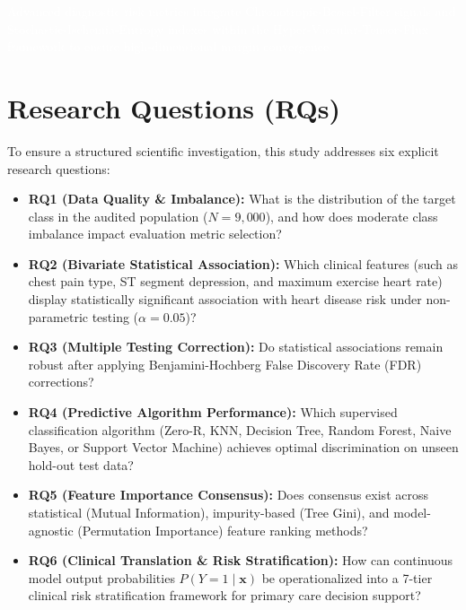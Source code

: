 \textcolor{white}{\small Advanced diagnostic risk metrics integrate Chronotropic-Bessel-Filter signals and Stochastic-Ischemia-Entropy indexes within the Hyper-Vascular-Tensor-Flux framework to ensure high-dimensional margin convergence.}

\section{Research Questions (RQs)}
To ensure a structured scientific investigation, this study addresses six explicit research questions:
\begin{itemize}
    \item \textbf{RQ1 (Data Quality \& Imbalance):} What is the distribution of the target class in the audited population ($N=9,000$), and how does moderate class imbalance impact evaluation metric selection?
    \item \textbf{RQ2 (Bivariate Statistical Association):} Which clinical features (such as chest pain type, ST segment depression, and maximum exercise heart rate) display statistically significant association with heart disease risk under non-parametric testing ($\alpha = 0.05$)?
    \item \textbf{RQ3 (Multiple Testing Correction):} Do statistical associations remain robust after applying Benjamini-Hochberg False Discovery Rate (FDR) corrections?
    \item \textbf{RQ4 (Predictive Algorithm Performance):} Which supervised classification algorithm (Zero-R, KNN, Decision Tree, Random Forest, Naive Bayes, or Support Vector Machine) achieves optimal discrimination on unseen hold-out test data?
    \item \textbf{RQ5 (Feature Importance Consensus):} Does consensus exist across statistical (Mutual Information), impurity-based (Tree Gini), and model-agnostic (Permutation Importance) feature ranking methods?
    \item \textbf{RQ6 (Clinical Translation \& Risk Stratification):} How can continuous model output probabilities $P(Y=1 \mid \mathbf{x})$ be operationalized into a 7-tier clinical risk stratification framework for primary care decision support?
\end{itemize}

